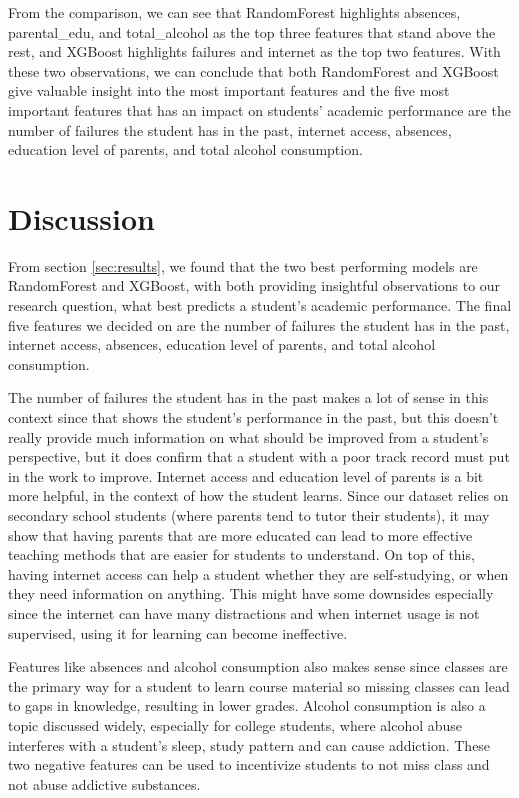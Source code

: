 \documentclass[11pt,a4paper]{article}
\begin{document}
From the comparison, we can see that RandomForest highlights absences, parental\_edu, and total\_alcohol as the top three features that stand above the rest, and XGBoost highlights failures and internet as the top two features. With these two observations, we can conclude that both RandomForest and XGBoost give valuable insight into the most important features and the five most important features that has an impact on students' academic performance are the number of failures the student has in the past, internet access, absences, education level of parents, and total alcohol consumption.

\section{Discussion}
From section \ref{sec:results}, we found that the two best performing models are RandomForest and XGBoost, with both providing insightful observations to our research question, what best predicts a student's academic performance. The final five features we decided on are the number of failures the student has in the past, internet access, absences, education level of parents, and total alcohol consumption.

The number of failures the student has in the past makes a lot of sense in this context since that shows the student's performance in the past, but this doesn't really provide much information on what should be improved from a student's perspective, but it does confirm that a student with a poor track record must put in the work to improve. Internet access and education level of parents is a bit more helpful, in the context of how the student learns. Since our dataset relies on secondary school students (where parents tend to tutor their students), it may show that having parents that are more educated can lead to more effective teaching methods that are easier for students to understand. On top of this, having internet access can help a student whether they are self-studying, or when they need information on anything. This might have some downsides especially since the internet can have many distractions and when internet usage is not supervised, using it for learning can become ineffective.

Features like absences and alcohol consumption also makes sense since classes are the primary way for a student to learn course material so missing classes can lead to gaps in knowledge, resulting in lower grades. Alcohol consumption is also a topic discussed widely, especially for college students, where alcohol abuse interferes with a student's sleep, study pattern and can cause addiction. These two negative features can be used to incentivize students to not miss class and not abuse addictive substances.
\end{document}
